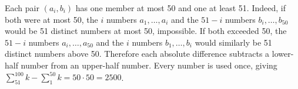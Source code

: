 Each pair $(a_i,b_i)$ has one member at most 50 and one at least 51. Indeed, if both were at most 50, the $i$ numbers $a_1,\ldots,a_i$ and the $51-i$ numbers $b_i,\ldots,b_{50}$ would be 51 distinct numbers at most 50, impossible. If both exceeded 50, the $51-i$ numbers $a_i,\ldots,a_{50}$ and the $i$ numbers $b_1,\ldots,b_i$ would similarly be 51 distinct numbers above 50. Therefore each absolute difference subtracts a lower-half number from an upper-half number. Every number is used once, giving $\sum_{51}^{100}k-\sum_1^{50}k=50\cdot50=\boxed{2500}$.
